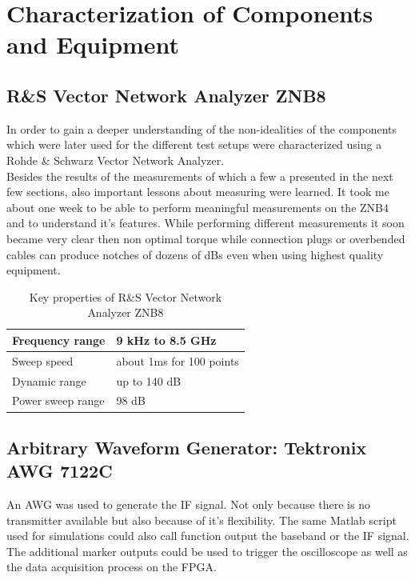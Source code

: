\chapter{Characterization of Components and Equipment}
\label{chap:comp}

\section{R\&S Vector Network Analyzer ZNB8}
In order to gain a deeper understanding of the non-idealities of the
components which were later used for the different test setups
were characterized using a Rohde \& Schwarz Vector Network Analyzer. \\

Besides the results of the measurements of which a few a presented
in the next few sections, also important lessons about measuring were
learned. It took me about one week to be able to perform meaningful
measurements on the ZNB4 and to understand it's features.
While performing different measurements it soon became very clear then
non optimal torque while connection plugs or overbended cables
can produce notches of dozens of dBs even when using highest quality
equipment. \\
\begin{table}[h]
  \centering
  \begin{tabular}{|l|l|}
    \hline
    Frequency range & 9 kHz to 8.5 GHz \\ \hline
    Sweep speed & about 1ms for 100 points \\ \hline
    Dynamic range & up to 140 dB \\ \hline
    Power sweep range & 98 dB \\ \hline
  \end{tabular}
  \caption{Key properties of R\&S Vector Network Analyzer ZNB8}
  \label{tab:awg}
\end{table}

\section{Arbitrary Waveform Generator: Tektronix AWG 7122C}
\label{sec:comp_awg}
An \acrfull{AWG} was used to generate the \gls{IF} signal.
Not only because there is no transmitter available but also because of
it's flexibility. The same Matlab script used for simulations could
also call function output the baseband or the \gls{IF} signal.
The additional marker outputs could be used to trigger the oscilloscope
as well as the data acquisition process on the \gls{FPGA}.

